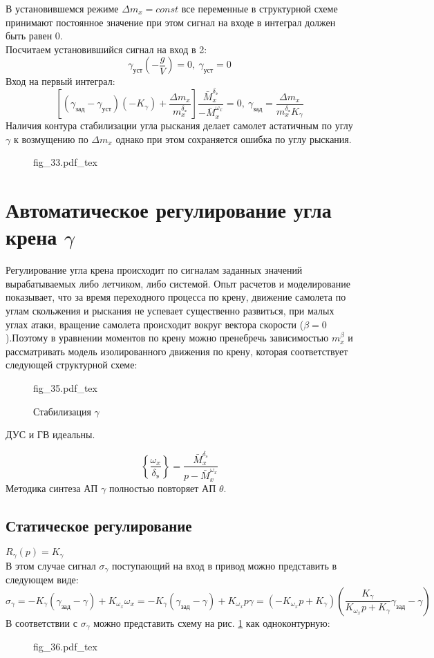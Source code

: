 \documentclass{article}
\begin{document}
В установившемся режиме $\Delta m_x = const$ все переменные в структурной схеме принимают постоянное значение при этом сигнал на входе в интеграл должен быть равен 0.\\
Посчитаем установившийся сигнал на вход в 2:
\[
	\gamma_\text{уст}(-\frac{g}{V}) = 0,\ \gamma_\text{уст} = 0 
\]
Вход на первый интеграл:
\[
	\left[(\gamma_\text{зад} - \gamma_\text{уст})(-K_\gamma)+\frac{\Delta m_x}{m_x^{\delta_\text{э}}}\right]\frac{\bar{M}_x^{\delta_\text{э}}}{-\bar{M}_x^{\omega_x}}= 0,\ \gamma_\text{зад}=\frac{\Delta m_x}{m_x^{\delta_\text{э}}K_{\gamma}} 
\]
Наличия контура стабилизации угла рыскания делает самолет астатичным по углу $\gamma$ к возмущению по $\Delta m_x$ однако при этом сохраняется ошибка по углу рыскания.

\begin{figure}[H]
	\centering
	{fig_33.pdf_tex}
\end{figure}

\section{Автоматическое регулирование угла крена \texorpdfstring{$\gamma$}{Lg}}
Регулирование угла крена происходит по сигналам заданных значений вырабатываемых либо летчиком, либо системой. Опыт расчетов и моделирование показывает, что за время переходного процесса по крену, движение самолета по углам скольжения и рыскания не успевает существенно развиться, при малых углах атаки, вращение самолета происходит вокруг вектора скорости ($\beta = 0$).Поэтому в уравнении моментов по крену можно пренебречь зависимостью $m_x^\beta$ и рассматривать модель изолированного движения по крену, которая соответствует следующей структурной схеме:

\begin{figure}[H]
	\centering
	{fig_35.pdf_tex}
	\caption{Стабилизация $\gamma$}
	\label{fig:stab_gamma}
\end{figure}
ДУС и ГВ идеальны.

\[
	\left\{\frac{\omega_x}{\delta_\text{э}} \right\} =\frac{\bar{M}_x^{\delta_\text{э}}}{ p - \bar{M}_x^{\omega_x}} 
\]
Методика синтеза АП $\gamma$ полностью повторяет АП $\theta$.

\subsection{Статическое регулирование}
$R_\gamma(p) = K_\gamma$\\
В этом случае сигнал $\sigma_\gamma$ поступающий на вход в привод можно представить в следующем виде: 
\[
	\sigma_\gamma =  - K_\gamma(\gamma_\text{зад} - \gamma) + K_{\omega_x} \omega_x = - K_{\gamma} (\gamma_\text{зад} - \gamma) + K_{\omega_x} p \gamma = (-K_{\omega_x} p + K_\gamma) \left(\frac{K_\gamma}{K_{\omega_x}p + K_\gamma} \gamma_\text{зад} - \gamma \right)
\]
В соответствии с $\sigma_\gamma$ можно представить схему на рис. \ref{fig:stab_gamma} как одноконтурную:
\begin{figure}[H]
	\centering
	{fig_36.pdf_tex}
\end{figure}
\end{document}
